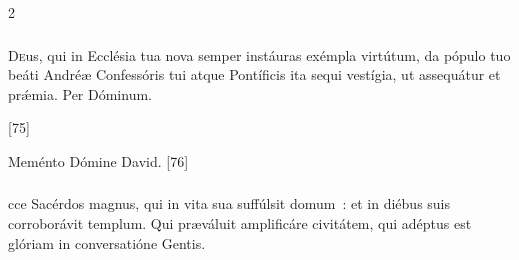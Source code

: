 \documentclass[9pt,twoside]{extarticle}
\begin{document}
\begin{multicols}{2}
{{\subsubsection*{\center {}}
\lettrine{D}eus, qui in Ecclésia tua nova semper instáuras exémpla virtútum, da pópulo tuo beáti Andréæ Confessóris tui atque Pontíficis ita sequi vestígia, ut assequátur et prǽmia. Per Dóminum.

\begin{tightlist}{}
\item {} [75]
\item {} Meménto Dómine David. [76]
\end{tightlist}

\subsubsection*{}
cce Sacérdos magnus, qui in vita sua suffúlsit domum~: et in diébus suis corroborávit templum. Qui præváluit amplificáre civitátem, qui adéptus est glóriam in conversatióne Gentis.

}}
\end{multicols}
\end{document}
